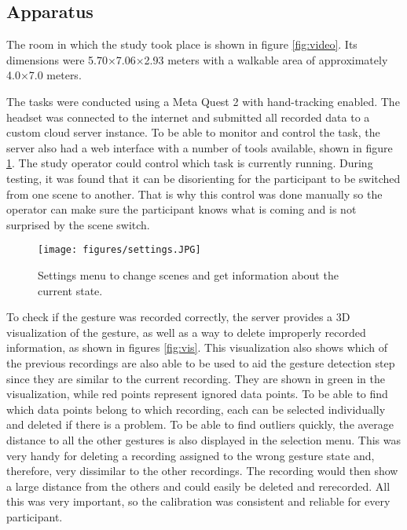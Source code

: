 \subsection{Apparatus}

The room in which the study took place is shown in figure \ref{fig:video}. Its dimensions were 5.70×7.06×2.93 meters with a walkable area of approximately 4.0×7.0 meters.

The tasks were conducted using a Meta Quest 2 with hand-tracking enabled. The headset was connected to the internet and submitted all recorded data to a custom cloud server instance. To be able to monitor and control the task, the server also had a web interface with a number of tools available, shown in figure \ref{fig:settings}. The study operator could control which task is currently running. During testing, it was found that it can be disorienting for the participant to be switched from one scene to another. That is why this control was done manually so the operator can make sure the participant knows what is coming and is not surprised by the scene switch.

\begin{figure}[!ht]
    \centering
    \texttt{[image: figures/settings.JPG]}
    \caption{Settings menu to change scenes and get information about the current state.}
    \label{fig:settings}
\end{figure}

To check if the gesture was recorded correctly, the server provides a 3D visualization of the gesture, as well as a way to delete improperly recorded information, as shown in figures \ref{fig:vis}. This visualization also shows which of the previous recordings are also able to be used to aid the gesture detection step since they are similar to the current recording. They are shown in green in the visualization, while red points represent ignored data points. To be able to find which data points belong to which recording, each can be selected individually and deleted if there is a problem. To be able to find outliers quickly, the average distance to all the other gestures is also displayed in the selection menu. This was very handy for deleting a recording assigned to the wrong gesture state and, therefore, very dissimilar to the other recordings. The recording would then show a large distance from the others and could easily be deleted and rerecorded. All this was very important, so the calibration was consistent and reliable for every participant.

